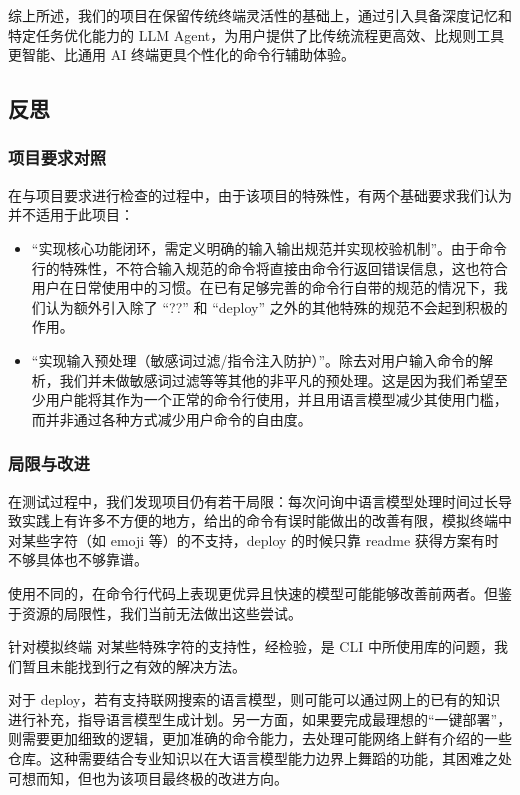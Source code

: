 \documentclass{article}
\theoremstyle{plain}
\theoremstyle{definition}
\theoremstyle{remark}
\begin{document}
综上所述，我们的项目在保留传统终端灵活性的基础上，通过引入具备深度记忆和特定任务优化能力的 LLM Agent，为用户提供了比传统流程更高效、比规则工具更智能、比通用 AI 终端更具个性化的命令行辅助体验。

\subsection{反思}

\subsubsection{项目要求对照}

在与项目要求进行检查的过程中，由于该项目的特殊性，有两个基础要求我们认为并不适用于此项目：


\begin{itemize}
\item “实现核心功能闭环，需定义明确的输入输出规范并实现校验机制”。由于命令行的特殊性，不符合输入规范的命令将直接由命令行返回错误信息，这也符合用户在日常使用中的习惯。在已有足够完善的命令行自带的规范的情况下，我们认为额外引入除了 “??” 和 “deploy” 之外的其他特殊的规范不会起到积极的作用。

\item “实现输入预处理（敏感词过滤/指令注入防护）”。除去对用户输入命令的解析，我们并未做敏感词过滤等等其他的非平凡的预处理。这是因为我们希望至少用户能将其作为一个正常的命令行使用，并且用语言模型减少其使用门槛，而并非通过各种方式减少用户命令的自由度。
\end{itemize}

\subsubsection{局限与改进}

在测试过程中，我们发现项目仍有若干局限：每次问询中语言模型处理时间过长导致实践上有许多不方便的地方，给出的命令有误时能做出的改善有限，模拟终端中对某些字符（如 emoji 等）的不支持，deploy 的时候只靠 readme 获得方案有时不够具体也不够靠谱。

使用不同的，在命令行代码上表现更优异且快速的模型可能能够改善前两者。但鉴于资源的局限性，我们当前无法做出这些尝试。

针对模拟终端 对某些特殊字符的支持性，经检验，是 CLI 中所使用库的问题，我们暂且未能找到行之有效的解决方法。

对于 deploy，若有支持联网搜索的语言模型，则可能可以通过网上的已有的知识进行补充，指导语言模型生成计划。另一方面，如果要完成最理想的“一键部署”，则需要更加细致的逻辑，更加准确的命令能力，去处理可能网络上鲜有介绍的一些仓库。这种需要结合专业知识以在大语言模型能力边界上舞蹈的功能，其困难之处可想而知，但也为该项目最终极的改进方向。
\end{document}
